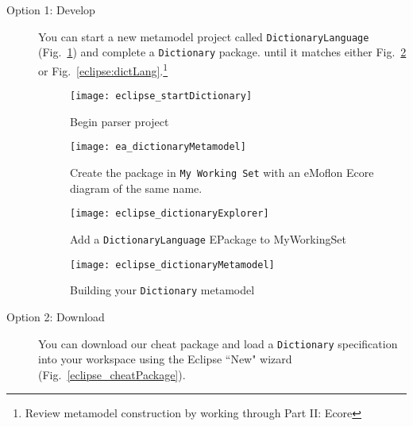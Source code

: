\begin{description}

\item[Option 1: Develop] You can start a new metamodel project called \texttt{Dict\-ion\-aryLanguage} (Fig.~\ref{eclipse:startMetamodel}) and complete a
\texttt{Dictionary} package. until it matches either Fig.~\ref{ea:dictLang} or Fig.~\ref{eclipse:dictLang}.\footnote{Review metamodel construction by
working through Part II: Ecore}

\begin{figure}[htbp]
\begin{center}
  \texttt{[image: eclipse\_startDictionary]}
  \caption{Begin parser project}
  \label{eclipse:startMetamodel}
\end{center}
\end{figure}

\newpage %

\begin{figure}[htb]
\begin{center}
  \texttt{[image: ea\_dictionaryMetamodel]}
  \caption{Create the package in \texttt{My Working Set} with an eMoflon Ecore diagram of the same name.}
  \label{ea:dictLang}
\end{center}
\end{figure}

\newpage %

\begin{figure}[htb]
\begin{center}
  \texttt{[image: eclipse\_dictionaryExplorer]}
  \caption{Add a \texttt{DictionaryLanguage} EPackage to MyWorkingSet}
  \label{eclipse:dictPackageExplorer}
\end{center}
\end{figure}

\begin{figure}[h!]
\begin{center}
  \texttt{[image: eclipse\_dictionaryMetamodel]}
  \caption{Building your \texttt{Dictionary} metamodel}
  \label{eclipse:dictLangMetamodel}
\end{center}
\end{figure}

\newpage %

\item[Option 2: Download] You can download our cheat package and load a \texttt{Dictionary} specification into your workspace using
the Eclipse ``New" wizard (Fig.~\ref{eclipse_cheatPackage}).


\end{description}

